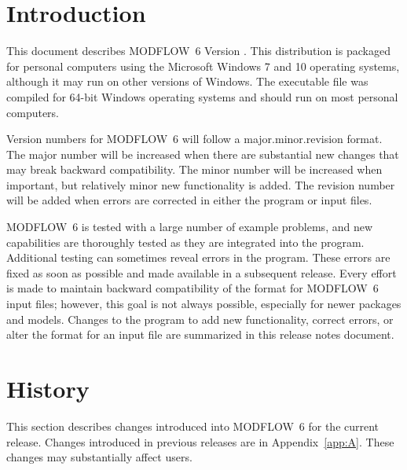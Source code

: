 \documentclass[11pt,twoside,twocolumn]{usgsreport}
\begin{document}
\ifdef{\makefrontcoveralt}{\makefrontcoveralt}{\makefrontcover}

\ifdef{\makefrontmatterabv}{\makefrontmatterabv}{\makefrontmatter}

\onecolumn
\pagestyle{body}
\RaggedRight
{}
\pagestyle{body}
\setlength{\parindent}{1.5pc}

\section{Introduction}
This document describes MODFLOW~6 Version \modflowversion.  This distribution is packaged for personal computers using the Microsoft Windows 7 and 10 operating systems, although it may run on other versions of Windows.  The executable file was compiled for 64-bit Windows operating systems and should run on most personal computers.

Version numbers for MODFLOW~6 will follow a major.minor.revision format.  The major number will be increased when there are substantial new changes that may break backward compatibility.  The minor number will be increased when important, but relatively minor new functionality is added.  The revision number will be added when errors are corrected in either the program or input files.

MODFLOW~6 is tested with a large number of example problems, and new capabilities are thoroughly tested as they are integrated into the program.  Additional testing can sometimes reveal errors in the program.  These errors are fixed as soon as possible and made available in a subsequent release.  Every effort is made to maintain backward compatibility of the format for MODFLOW~6 input files; however, this goal is not always possible, especially for newer packages and models.  Changes to the program to add new functionality, correct errors, or alter the format for an input file are summarized in this release notes document.

\section{History}
This section describes changes introduced into MODFLOW~6 for the current release.  Changes introduced in previous releases are in Appendix~\ref{app:A}. These changes may substantially affect users.
\end{document}
